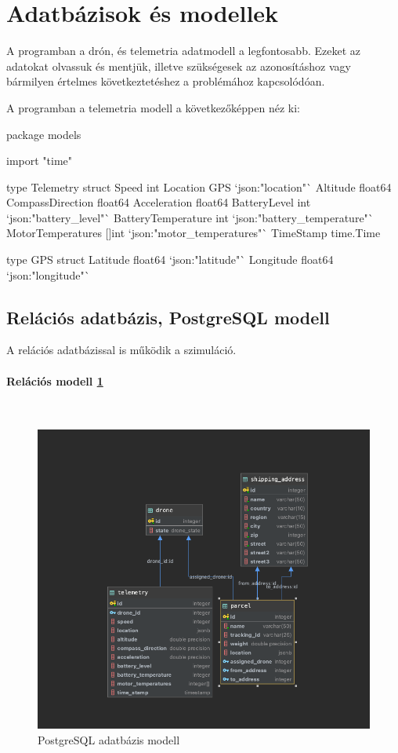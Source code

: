 

\section{Adatbázisok és modellek}
A programban a drón, és telemetria adatmodell a legfontosabb. Ezeket az adatokat olvassuk és mentjük,
illetve szükségesek az azonosításhoz vagy bármilyen értelmes következtetéshez a problémához kapcsolódóan.

A programban a telemetria modell a következőképpen néz ki:
\begin{python}
    package models

    import "time"

    type Telemetry struct {
    Speed              int
    Location           GPS `json:"location"`
    Altitude           float64
    CompassDirection   float64
    Acceleration       float64
    BatteryLevel       int   `json:"battery_level"`
    BatteryTemperature int   `json:"battery_temperature"`
    MotorTemperatures  []int `json:"motor_temperatures"`
    TimeStamp          time.Time
    }

    type GPS struct {
    Latitude  float64 `json:"latitude"`
    Longitude float64 `json:"longitude"`
    }

\end{python}

\subsection{Relációs adatbázis, PostgreSQL modell}
A relációs adatbázissal is működik a szimuláció.
\paragraph{Relációs modell \ref{fig:postgres} } \mbox{} \\

\begin{figure}[h]
    \centering
    \includegraphics[scale=0.4]{images/postgres.png}
    \caption{PostgreSQL adatbázis modell}
    \label{fig:postgres}
\end{figure}

